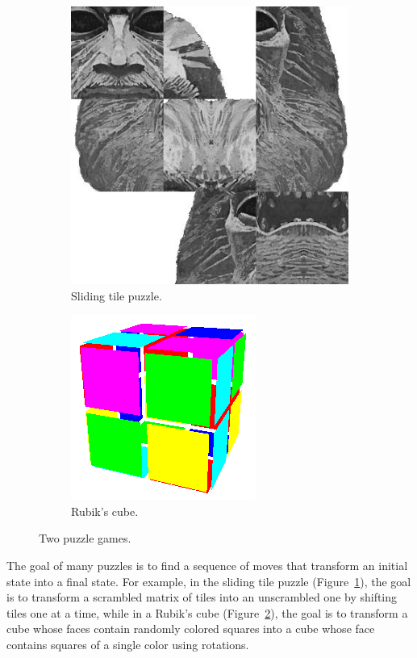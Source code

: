 \documentclass{pset}
\begin{document}
\begin{figure}
\centering
\begin{subfigure}{.5\textwidth}
  \centering
  \includegraphics[scale=0.25]{images/tile.png}
  \caption{Sliding tile puzzle.}
  \label{fig:tile}
\end{subfigure}\begin{subfigure}{.5\textwidth}
  \centering
  \includegraphics[scale=0.4]{images/cube.png}
  \caption{Rubik's cube.}
  \label{fig:rubik}
\end{subfigure}%
\caption{Two puzzle games.}
\label{fig:games}
\end{figure}

The goal of many puzzles is to find a sequence of moves that transform
an initial state into a final state. For example, in the sliding tile
puzzle (Figure~\ref{fig:tile}), the goal is to transform a scrambled
matrix of tiles into an unscrambled one by shifting tiles one at a
time, while in a Rubik's cube (Figure~\ref{fig:rubik}), the goal is to
transform a cube whose faces contain randomly colored squares into a
cube whose face contains squares of a single color using rotations.
\end{document}
